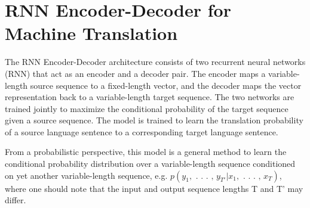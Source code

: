 \documentclass[12pt]{report}
\begin{document}
%

\pagebreak
\clearpage

\section{RNN Encoder-Decoder for Machine Translation}
The RNN Encoder-Decoder architecture consists
of two recurrent neural networks (RNN) that
act as an encoder and a decoder pair. The encoder
maps a variable-length source sequence to a
fixed-length vector, and the decoder maps the vector
representation back to a variable-length target
sequence. The two networks are trained jointly to
maximize the conditional probability of the target
sequence given a source sequence.
The model is trained to learn the translation probability
of a source language sentence to a corresponding target language
sentence.\cite{enc_dec}
 
From a probabilistic perspective, this model
is a general method to learn the conditional probability distribution
over a variable-length sequence conditioned
on yet another variable-length sequence,
e.g. $p(y_{1},\text{ . . . , }y_{T'} | x_{1},\text{ . . . , }x_{T} )$, where one should note that the input and output sequence
lengths T and T' may differ.
\end{document}
